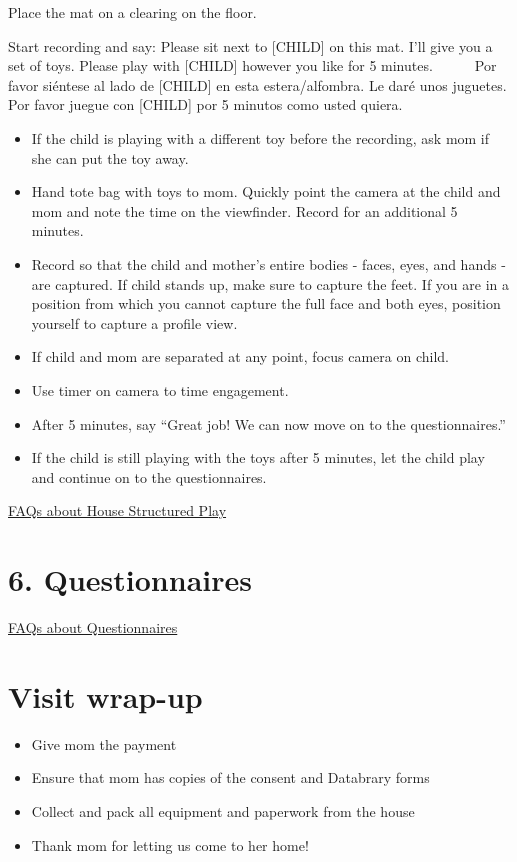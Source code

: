 \documentclass[
]{book}
\providecommand{\tightlist}{%
  \setlength{\itemsep}{0pt}\setlength{\parskip}{0pt}}
\begin{document}
Place the mat on a clearing on the floor.

Start recording and say: Please sit next to {[}CHILD{]} on this mat. I'll give you a set of toys. Please play with {[}CHILD{]} however you like for 5 minutes.
    Por favor siéntese al lado de {[}CHILD{]} en esta estera/alfombra. Le daré unos juguetes. Por favor juegue con {[}CHILD{]} por 5 minutos como usted quiera.

\begin{itemize}
\tightlist
\item
  If the child is playing with a different toy before the recording, ask mom if she can put the toy away.
\item
  Hand tote bag with toys to mom. Quickly point the camera at the child and mom and note the time on the viewfinder. Record for an additional 5 minutes.
\item
  Record so that the child and mother's entire bodies - faces, eyes, and hands - are captured. If child stands up, make sure to capture the feet. If you are in a position from which you cannot capture the full face and both eyes, position yourself to capture a profile view.
\item
  If child and mom are separated at any point, focus camera on child.
\item
  Use timer on camera to time engagement.
\item
  After 5 minutes, say ``Great job! We can now move on to the questionnaires.''
\item
  If the child is still playing with the toys after 5 minutes, let the child play and continue on to the questionnaires.
\end{itemize}

\protect\hyperlink{faqs_structured_play}{FAQs about House Structured Play}

\hypertarget{questionnaires}{%
\section{6. Questionnaires}\label{questionnaires}}

\protect\hyperlink{faqs_questionnaires}{FAQs about Questionnaires}

\hypertarget{visit-wrap-up}{%
\section{Visit wrap-up}\label{visit-wrap-up}}

\begin{itemize}
\tightlist
\item
  Give mom the payment
\item
  Ensure that mom has copies of the consent and Databrary forms
\item
  Collect and pack all equipment and paperwork from the house
\item
  Thank mom for letting us come to her home!
\end{itemize}
\end{document}
